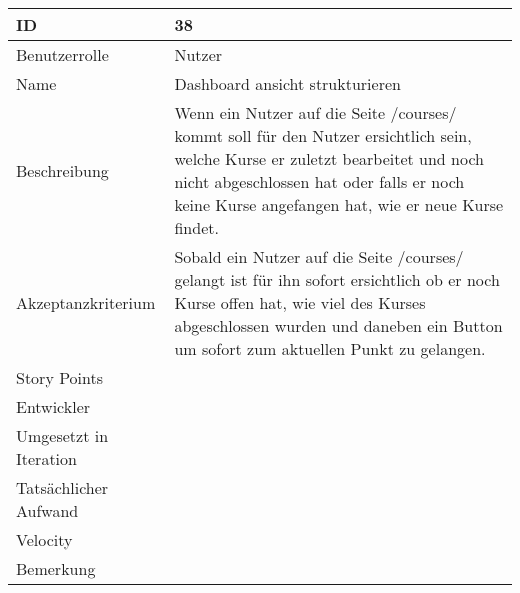 \begin{tabularx}{\textwidth}{|p{}|X|}
	\hline
	ID & 38 \\
	\hline
	Benutzerrolle & Nutzer \\
	\hline
	Name & Dashboard ansicht strukturieren\\
	\hline
	Beschreibung & Wenn ein Nutzer auf die Seite /courses/ kommt soll für den Nutzer ersichtlich sein, welche Kurse er zuletzt bearbeitet und noch nicht abgeschlossen hat oder falls er noch keine Kurse angefangen hat, wie er neue Kurse findet.  \\
	\hline
	Akzeptanzkriterium & Sobald ein Nutzer auf die Seite /courses/ gelangt ist für ihn sofort ersichtlich ob er noch Kurse offen hat, wie viel des Kurses abgeschlossen wurden und daneben ein Button um sofort zum aktuellen Punkt zu gelangen. \\
	\hline
	Story Points & \\
	\hline
	Entwickler & \\
	\hline
	Umgesetzt in Iteration & \\
	\hline
	Tatsächlicher Aufwand & \\
	\hline
	Velocity & \\
	\hline
	Bemerkung & \\
	\hline
\end{tabularx}
\vspace{20pt}
